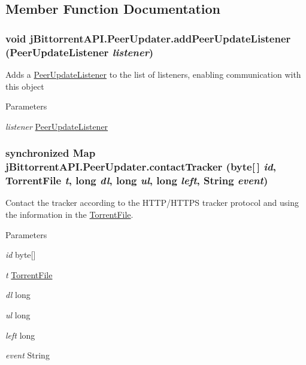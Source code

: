 \subsection{Member Function Documentation}
\hypertarget{classj_bittorrent_a_p_i_1_1_peer_updater_ae0f20884a45817fec9f86f4647a9c348}{
\subsubsection[{addPeerUpdateListener}]{\setlength{\rightskip}{0pt plus 5cm}void jBittorrentAPI.PeerUpdater.addPeerUpdateListener ({\bf PeerUpdateListener} {\em listener})}}
\label{classj_bittorrent_a_p_i_1_1_peer_updater_ae0f20884a45817fec9f86f4647a9c348}
Adds a \hyperlink{interfacej_bittorrent_a_p_i_1_1_peer_update_listener}{PeerUpdateListener} to the list of listeners, enabling communication with this object 
\begin{DoxyParams}{Parameters}
\item[{\em listener}]\hyperlink{interfacej_bittorrent_a_p_i_1_1_peer_update_listener}{PeerUpdateListener} \end{DoxyParams}
\hypertarget{classj_bittorrent_a_p_i_1_1_peer_updater_ad3ea391dbd2de9c4a5365a082ced4b10}{
\subsubsection[{contactTracker}]{\setlength{\rightskip}{0pt plus 5cm}synchronized Map jBittorrentAPI.PeerUpdater.contactTracker (byte\mbox{[}$\,$\mbox{]} {\em id}, \/  {\bf TorrentFile} {\em t}, \/  long {\em dl}, \/  long {\em ul}, \/  long {\em left}, \/  String {\em event})}}
\label{classj_bittorrent_a_p_i_1_1_peer_updater_ad3ea391dbd2de9c4a5365a082ced4b10}
Contact the tracker according to the HTTP/HTTPS tracker protocol and using the information in the \hyperlink{classj_bittorrent_a_p_i_1_1_torrent_file}{TorrentFile}. 
\begin{DoxyParams}{Parameters}
\item[{\em id}]byte\mbox{[}\mbox{]} \item[{\em t}]\hyperlink{classj_bittorrent_a_p_i_1_1_torrent_file}{TorrentFile} \item[{\em dl}]long \item[{\em ul}]long \item[{\em left}]long \item[{\em event}]String \end{DoxyParams}
